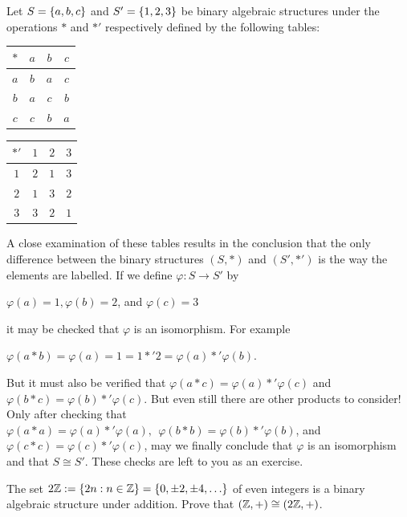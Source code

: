 \documentclass[11pt,fleqn,dvipsnames,usenames]{article}
\newcommand{\p}{\noindent}
\begin{document}
%
\begin{example}\label{firstisomorphismexample}
Let $S = \left\{a,b,c\right\}$ and $S' = \left\{1,2,3\right\}$ be binary algebraic structures under the operations $*$ and $*'$ respectively defined by the following tables:
\begin{center}
\bgroup
\begin{center}
\def\arraystretch{1.5}
\begin{tabular}{c|ccc}
$*$ & $a$ & $b$ & $c$\\
\hline
$a$ & $b$ & $a$ & $c$\\
$b$ & $a$ & $c$ & $b$\\
$c$ & $c$ & $b$ & $a$\\
\end{tabular}
\hspace{3cm}
\begin{tabular}{c|ccc}
$*'$ & $1$ & $2$ & $3$\\
\hline
$1$ & $2$ & $1$ & $3$\\
$2$ & $1$ & $3$ & $2$\\
$3$ & $3$ & $2$ & $1$\\
\end{tabular}
\end{center}
\egroup
\end{center}
\p A close examination of these tables results in the conclusion that the only difference between the binary structures $(S,*)$ and $(S', *')$ is the way the elements are labelled.  If we define $\varphi:S\to S'$ by
\begin{center}
$\varphi(a) = 1, \varphi(b) = 2$, and $\varphi(c) = 3$
\end{center}
it may be checked that $\varphi$ is an isomorphism.  For example
\begin{center}
$\varphi(a*b) = \varphi(a) = 1 = 1*' 2 = \varphi(a)*'\varphi(b)$.
\end{center}
\p But it must also be verified that $\varphi(a*c) = \varphi(a)*'\varphi(c)$ and $\varphi(b*c) = \varphi(b)*'\varphi(c)$.  But even still there are other products to consider!  Only after checking that $\varphi(a*a) = \varphi(a)*'\varphi(a), \ \ \varphi(b*b) = \varphi(b)*'\varphi(b)$, and $\varphi(c*c) = \varphi(c)*'\varphi(c)$, may we finally conclude that $\varphi$ is an isomorphism and that $S\cong S'$.  These checks are left to you as an exercise.
\end{example}
%
\begin{exercise}
The set $2\mathbb{Z} := \left\{2n:n\in\mathbb{Z}\right\} = \left\{0, \pm 2, \pm 4,\ldots\right\}$ of even integers is a binary algebraic structure under addition.  Prove that $(\mathbb{Z},+)\cong (2\mathbb{Z},+)$.
\end{exercise}
\end{document}
